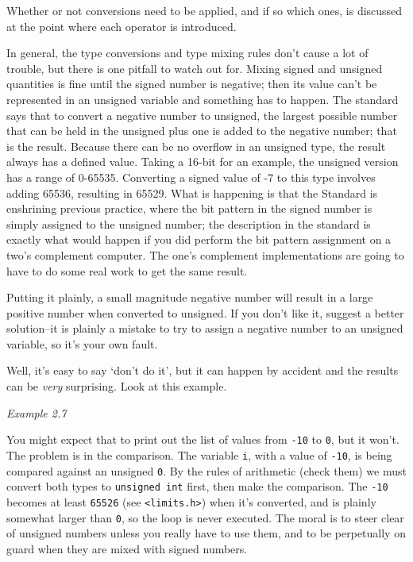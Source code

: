     Whether or not conversions need to be applied, and if so which ones, is
     discussed at the point where each operator is introduced.


    In general, the type conversions and type mixing rules don't cause a
     lot of trouble, but there is one pitfall to watch out for. Mixing signed
     and unsigned quantities is fine until the signed number is negative; then
     its value can't be represented in an unsigned variable and something has
     to happen. The standard says that to convert a negative number to
     unsigned, the largest possible number that can be held in the unsigned
     plus one is added to the negative number; that is the result. Because
     there can be no overflow in an unsigned type, the result always has a
     defined value. Taking a 16-bit \kint{} for an example, the
     unsigned version has a range of 0-65535. Converting a signed value
     of -7 to this type involves adding 65536, resulting
     in 65529. What is happening is that the Standard is enshrining
     previous practice, where the bit pattern in the signed number is simply
     assigned to the unsigned number; the description in the standard is
     exactly what would happen if you did perform the bit pattern assignment
     on a two's complement computer. The one's complement implementations are
     going to have to do some real work to get the same result.


    Putting it plainly, a small magnitude negative number will result in a
     large positive number when converted to unsigned. If you don't like it,
     suggest a better solution--it is plainly a mistake to try to assign
     a negative number to an unsigned variable, so it's your own fault.


    Well, it's easy to say `don't do it', but it can happen by
     accident and the results can be \textit{very} surprising. Look at this
     example.


     \begin{center}\textit{Example 2.7}\end{center}


    You might expect that to print out the list of values
     from \texttt{-10} to \texttt{0}, but it won't. The
     problem is in the comparison. The variable \texttt{i}, with a
     value of \texttt{-10}, is being compared against an
     unsigned \texttt{0}. By the rules of arithmetic (check them) we
     must convert both types to \texttt{unsigned int} first, then make the
     comparison. The \texttt{-10} becomes at
     least \texttt{65526} (see \texttt{<limits.h>}) when
     it's converted, and is plainly somewhat larger than \texttt{0},
     so the loop is never executed. The moral is to steer clear of unsigned
     numbers unless you really have to use them, and to be perpetually on
     guard when they are mixed with signed numbers.


